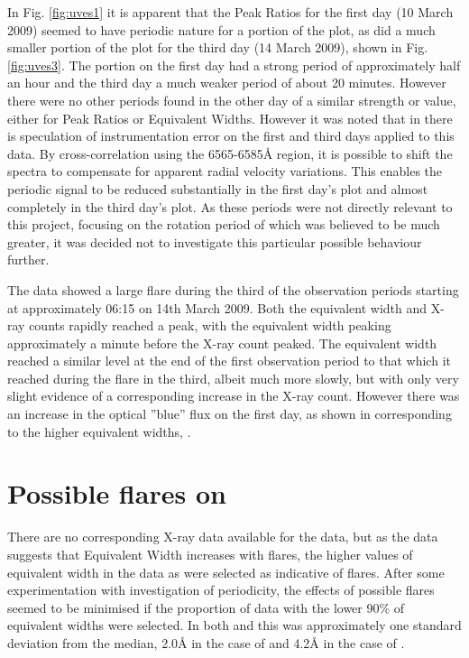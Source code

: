 In Fig. \ref{fig:uves1} it is apparent that the Peak Ratios for the first day (10 March 2009) seemed to have periodic
nature for a portion of the plot, as did a much smaller portion of the plot for the third day (14 March 2009), shown in
Fig. \ref{fig:uves3}. The portion on the first day had a strong period of approximately half an hour and the third day a
much weaker period of about 20 minutes.  However there were no other periods found in the other day of a similar
strength or value, either for Peak Ratios or Equivalent Widths. However it was noted that in \citet[Section
4.1]{barnes14} there is speculation of instrumentation error on the first and third days applied to this data. By
cross-correlation using the 6565-6585{\AA} region, it is possible to shift the spectra to compensate for apparent radial
velocity variations. This enables the periodic signal to be reduced substantially in the first day's plot and almost
completely in the third day's plot. As these periods were not directly relevant to this project, focusing on the
rotation period of {\prox} which was believed to be much greater, it was decided not to investigate this particular
possible behaviour further.

The {\uves} data showed a large flare during the third of the observation periods starting at approximately 06:15 on
14th March 2009. Both the equivalent width and X-ray counts rapidly reached a peak, with the equivalent width peaking
approximately a minute before the X-ray count peaked. The equivalent width reached a similar level at the end of the
first observation period to that which it reached during the flare in the third, albeit much more slowly, but with only
very slight evidence of a corresponding increase in the X-ray count. However there was an increase in the {\uves}
optical ''blue'' flux on the first day, as shown in \citet[fig. 1]{fuhrmeister11} corresponding to the higher equivalent
widths, .

\section{Possible flares on {\harps}}
\protect\label{section:harpsflares}

There are no corresponding X-ray data available for the {\harps} data, but as the {\uves} data suggests that {\ha}
Equivalent Width increases with flares, the higher values of equivalent width in the {\harps} data as were selected as
indicative of flares. After some experimentation with investigation of periodicity, the effects of possible flares
seemed to be minimised if the proportion of data with the lower 90\% of equivalent widths were selected. In both {\uves}
and {\harps} this was approximately one standard deviation from the median, 2.0{\AA} in the case of {\uves} and 4.2{\AA}
in the case of {\harps}.

